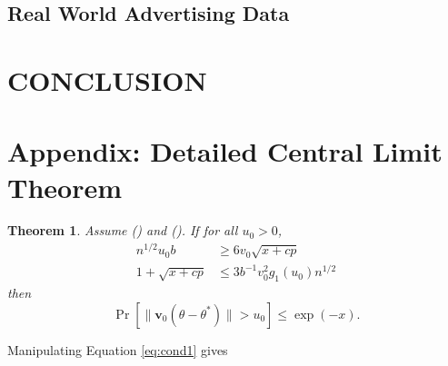 \documentclass[twoside]{article}
\newtheorem{theorem}{Theorem}
\newcommand{\vv}{\mathbf{v}}
\newcommand{\w}{\theta}
\newcommand{\wstar}{{\w^{*}}}
\newcommand{\ltwo}[1]{{\lVert {#1} \rVert}}
\newcommand{\prob}[1]{\Pr\left[{#1}\right]}
\begin{document}
\subsection{Real World Advertising Data}

\section{CONCLUSION}






\newpage
\section*{Appendix: Detailed Central Limit Theorem}

\begin{theorem}
Assume () and ().
If for all $u_0 > 0$,
\begin{align}
n^{1/2}u_0b & \ge 6 v_0 \sqrt{x+cp}
\label{eq:cond1}
\\
1 + \sqrt{x+cp} &\le 3b^{-1}v_0^2g_1(u_0) n^{1/2}
\label{eq:cond2}
\end{align}
then
\begin{equation}
\prob{\ltwo{\vv_0(\w-\wstar)} > u_0} \le \exp(-x)
.
\end{equation}
\end{theorem}

Manipulating Equation \ref{eq:cond1} gives
\begin{align}
\end{align}
\end{document}
